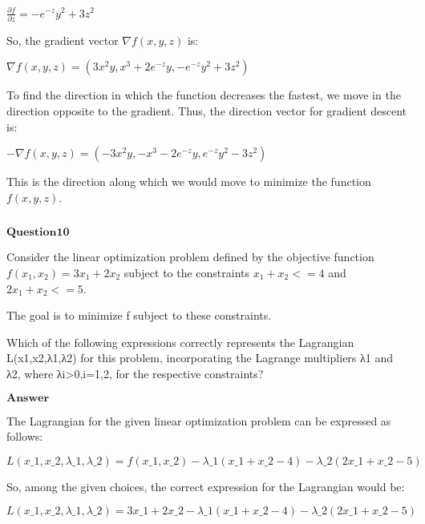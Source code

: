 \documentclass[11pt]{article}
\makeatletter
\newcommand{\boxspacing}{\kern\kvtcb@left@rule\kern\kvtcb@boxsep}
\newcommand{\prompt}[4]{
        {\ttfamily\llap{{\color{#2}[#3]:\hspace{3pt}#4}}\vspace{-\baselineskip}}
    }
\makeatother
\begin{document}
$\frac{\partial f}{\partial z} = -e^{-z}y^2 + 3z^2$

So, the gradient vector $ \nabla f(x, y, z) $ is:

$\nabla f(x, y, z) = \left( 3x^2 y, x^3 + 2e^{-z}y, -e^{-z}y^2 + 3z^2 \right)$

To find the direction in which the function decreases the fastest, we
move in the direction opposite to the gradient. Thus, the direction
vector for gradient descent is:

$-\nabla f(x, y, z) = \left( -3x^2 y, -x^3 - 2e^{-z}y, e^{-z}y^2 - 3z^2 \right)$

This is the direction along which we would move to minimize the function
$ f(x, y, z) $.

    \begin{tcolorbox}[breakable, size=fbox, boxrule=1pt, pad at break*=1mm,colback=cellbackground, colframe=cellborder]
\prompt{In}{incolor}{ }{\boxspacing}
\begin{Verbatim}[commandchars=\\\{\}]

\end{Verbatim}
\end{tcolorbox}

    $\textbf{Question10}$

Consider the linear optimization problem defined by the objective
function $f(x_1,x_2)=3x_1+2x_2$ subject to the constraints
$x_1+x_2<=4$ and $2x_1+x_2<=5$.

The goal is to minimize f subject to these constraints.

Which of the following expressions correctly represents the Lagrangian
L(x1,x2,λ1,λ2) for this problem, incorporating the Lagrange multipliers
λ1 and λ2, where λi\textgreater0,i=1,2, for the respective constraints?

$\textbf{Answer}$

    The Lagrangian for the given linear optimization problem can be
expressed as follows:

$ L(x\_1, x\_2, \lambda\_1, \lambda\_2) = f(x\_1, x\_2) - \lambda\_1
(x\_1 + x\_2 - 4) - \lambda\_2 (2x\_1 + x\_2 - 5) $

So, among the given choices, the correct expression for the Lagrangian
would be:

$ L(x\_1, x\_2, \lambda\_1, \lambda\_2) = 3x\_1 + 2x\_2 - \lambda\_1
(x\_1 + x\_2 - 4) - \lambda\_2 (2x\_1 + x\_2 - 5) $

    \begin{tcolorbox}[breakable, size=fbox, boxrule=1pt, pad at break*=1mm,colback=cellbackground, colframe=cellborder]
\prompt{In}{incolor}{ }{\boxspacing}
\begin{Verbatim}[commandchars=\\\{\}]

\end{Verbatim}
\end{tcolorbox}
\end{document}
